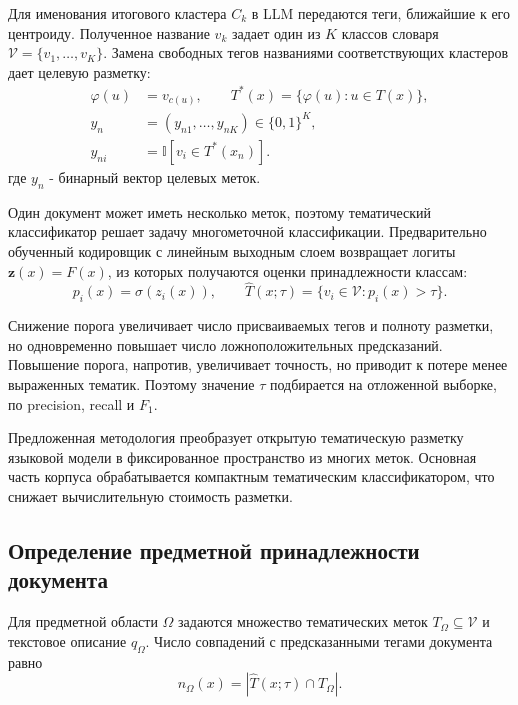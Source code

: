 \documentclass[12pt,a4paper]{article}
\begin{document}
Для именования итогового кластера $C_k$ в LLM передаются теги, ближайшие к его центроиду.
Полученное название $v_k$ задает один из $K$ классов словаря $\mathcal V=\{v_1,\ldots,v_K\}$.
Замена свободных тегов названиями соответствующих кластеров дает целевую разметку:
\begin{equation}
\begin{aligned}
\varphi(u) &= v_{c(u)}, \qquad
T^*(x)=\{\varphi(u):u\in T(x)\},\\
y_n &= (y_{n1},\ldots,y_{nK})\in\{0,1\}^K,\\
y_{ni} &= \mathbb{I}[v_i\in T^*(x_n)].
\end{aligned}
\end{equation}
где $y_n$ - бинарный вектор целевых меток.

Один документ может иметь несколько меток, поэтому тематический классификатор решает задачу многометочной классификации.
Предварительно обученный кодировщик с линейным выходным слоем возвращает логиты
$\mathbf z(x)=F(x)$, из которых получаются оценки принадлежности классам:
\begin{equation}
p_i(x)=\sigma(z_i(x)),
\qquad
\widehat T(x;\tau)=\{v_i\in\mathcal V:p_i(x)>\tau\}.
\end{equation}

Снижение порога увеличивает число присваиваемых тегов и полноту разметки, 
но одновременно повышает число ложноположительных предсказаний. 
Повышение порога, напротив, увеличивает точность, но приводит к потере менее выраженных тематик. 
Поэтому значение $\tau$ подбирается на отложенной выборке, по precision, recall и $F_1$.

Предложенная методология преобразует открытую тематическую разметку языковой модели 
в фиксированное пространство из многих меток. 
Основная часть корпуса обрабатывается компактным тематическим классификатором, что
снижает вычислительную стоимость разметки.

\subsection{Определение предметной принадлежности документа}

Для предметной области $\Omega$ задаются множество тематических меток $T_\Omega\subseteq\mathcal V$
и текстовое описание $q_\Omega$. Число совпадений с предсказанными тегами документа равно
\begin{equation}
n_\Omega(x)=|\widehat T(x;\tau)\cap T_\Omega|.
\end{equation}
\end{document}
